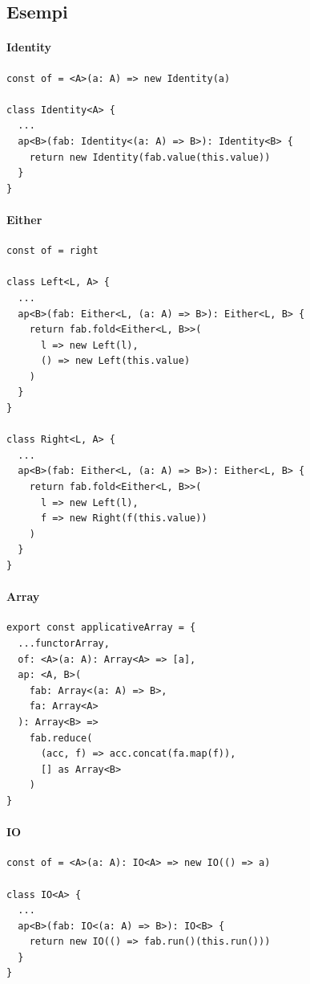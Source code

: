 \documentclass[12pt]{article}
\begin{document}
\subsection{Esempi}

\paragraph{Identity}

\begin{verbatim}
const of = <A>(a: A) => new Identity(a)

class Identity<A> {
  ...
  ap<B>(fab: Identity<(a: A) => B>): Identity<B> {
    return new Identity(fab.value(this.value))
  }
}
\end{verbatim}

\paragraph{Either}

\begin{verbatim}
const of = right

class Left<L, A> {
  ...
  ap<B>(fab: Either<L, (a: A) => B>): Either<L, B> {
    return fab.fold<Either<L, B>>(
      l => new Left(l),
      () => new Left(this.value)
    )
  }
}

class Right<L, A> {
  ...
  ap<B>(fab: Either<L, (a: A) => B>): Either<L, B> {
    return fab.fold<Either<L, B>>(
      l => new Left(l),
      f => new Right(f(this.value))
    )
  }
}
\end{verbatim}

\paragraph{Array}

\begin{verbatim}
export const applicativeArray = {
  ...functorArray,
  of: <A>(a: A): Array<A> => [a],
  ap: <A, B>(
    fab: Array<(a: A) => B>,
    fa: Array<A>
  ): Array<B> =>
    fab.reduce(
      (acc, f) => acc.concat(fa.map(f)),
      [] as Array<B>
    )
}
\end{verbatim}

\paragraph{IO}

\begin{verbatim}
const of = <A>(a: A): IO<A> => new IO(() => a)

class IO<A> {
  ...
  ap<B>(fab: IO<(a: A) => B>): IO<B> {
    return new IO(() => fab.run()(this.run()))
  }
}
\end{verbatim}
\end{document}
